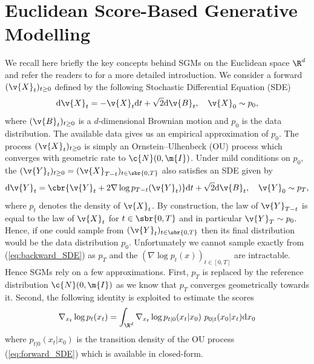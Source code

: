 \section{Euclidean Score-Based Generative Modelling} \label{sec:eucl-sgm-riem} We recall here briefly the key concepts behind SGMs on the Euclidean space $\R^d$ and refer the readers to \textcite{song2020score} for a more detailed introduction.
We consider a forward  $(\v{X}_t)_{t \geq 0}$ defined by the following Stochastic Differential Equation (SDE) \begin{equation}\label{eq:forward_SDE} \mathrm{d} \v{X}_t = -\v{X}_t \mathrm{d} t + \sqrt{2} \mathrm{d} \v{B}_t,\quad \v{X}_0 \sim p_0 , \end{equation} where $(\v{B}_t)_{t \geq 0}$ is a $d$-dimensional Brownian motion and $p_0$ is the data distribution.
The available data gives us an empirical approximation of $p_0$.
The process $(\v{X}_t)_{t \geq 0}$ is simply an Ornstein--Ulhenbeck (OU) process which converges with geometric rate to $\c{N}(0,\m{I})$.
Under mild conditions on $p_0$, the  $(\v{Y}_t)_{t \geq 0} = (\v{X}_{T-t})_{t \in \sbr{0,T}}$ also satisfies an SDE \parencite{cattiaux2021time,haussmann1986time} given by \begin{equation} \label{eq:backward_SDE} \mathrm{d} \v{Y}_t = \cbr{ \v{Y}_t + 2 \nabla \log p_{T-t}(\v{Y}_t)} \mathrm{d} t + \sqrt{2} \mathrm{d} \v{B}_t,\quad \v{Y}_0 \sim p_T , \end{equation} where $p_t$ denotes the density of $\v{X}_t$.
By construction, the law of $\v{Y}_{T-t}$ is equal to the law of $\v{X}_t$ for $t \in \sbr{0,T}$ and in particular $\v{Y}_{T}\sim p_0$.
Hence, if one could sample from $(\v{Y}_t)_{t \in \sbr{0,T}}$ then its final distribution would be the data distribution $p_0$.
Unfortunately we cannot sample exactly from (\ref{eq:backward_SDE}) as $p_T$ and the  $(\nabla \log p_t(x))_{t\in[0,T]}$ are intractable.
Hence SGMs rely on a few approximations.
First, $p_T$ is replaced by the reference distribution $\c{N}(0,\m{I})$ as we know that $p_T$ converges geometrically towards it.
Second, the following  identity is exploited to estimate the scores \begin{equation}\label{eq:scoreidentity} \nabla_{x_t} \log p_t(x_t) = \int_{\R^d} \nabla_{x_t} \log p_{t|0}(x_t|x_0)~p_{0|t}(x_0|x_t) \mathrm{d} x_0 \end{equation} where $p_{t|0}(x_t|x_0)$ is the transition density of the OU process (\ref{eq:forward_SDE}) which is available in closed-form.
